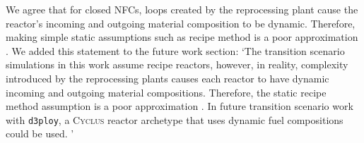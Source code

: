 \documentclass[answers,11pt]{exam}
\newcommand{\Cyclus}{\textsc{Cyclus}\xspace}%
\newcommand{\deploy}{\texttt{d3ploy}\xspace}%
\begin{document}
\begin{questions}
\begin{solution}
We agree that for closed NFCs, loops created by the reprocessing plant cause the reactor's 
incoming and outgoing material composition to be dynamic. Therefore, making simple static 
assumptions such as recipe method is a poor approximation 
\cite{bae_neural_2019,peterson-droogh_value_2018}. 
We added this statement to the future work section: 
`The transition scenario simulations in this work assume recipe reactors, 
however, in reality, complexity introduced by the reprocessing plants causes 
each reactor to have dynamic incoming and outgoing material compositions. 
Therefore, the static recipe method assumption is a poor approximation 
\cite{bae_neural_2019,peterson-droogh_value_2018}. 
In future transition scenario work with \deploy, a \Cyclus 
reactor archetype that uses dynamic fuel compositions could be used.  '

\end{solution}

\question 


\end{questions}
\end{document}
